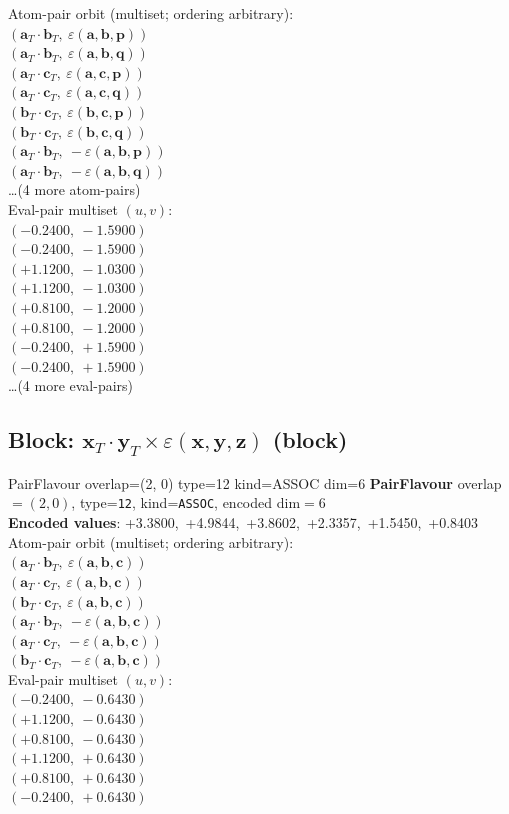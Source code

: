 \documentclass[a4paper,11pt]{article}
\newcommand{\fpbeomcfokjooi}[2]{\mathbf{#1}_T \cdot \mathbf{#2}_T}
\newcommand{\kblbmcpggoncpf}[3]{\varepsilon(\mathbf{#1},\mathbf{#2},\mathbf{#3})}
\begin{document}
\quad Atom-pair orbit (multiset; ordering arbitrary):\\
$(\fpbeomcfokjooi{a}{b},\ \kblbmcpggoncpf{a}{b}{p})$\\
$(\fpbeomcfokjooi{a}{b},\ \kblbmcpggoncpf{a}{b}{q})$\\
$(\fpbeomcfokjooi{a}{c},\ \kblbmcpggoncpf{a}{c}{p})$\\
$(\fpbeomcfokjooi{a}{c},\ \kblbmcpggoncpf{a}{c}{q})$\\
$(\fpbeomcfokjooi{b}{c},\ \kblbmcpggoncpf{b}{c}{p})$\\
$(\fpbeomcfokjooi{b}{c},\ \kblbmcpggoncpf{b}{c}{q})$\\
$(\fpbeomcfokjooi{a}{b},\ -\kblbmcpggoncpf{a}{b}{p})$\\
$(\fpbeomcfokjooi{a}{b},\ -\kblbmcpggoncpf{a}{b}{q})$\\
\quad \ldots (4 more atom-pairs)\\
\quad Eval-pair multiset $(u, v)$:\\
$(-0.2400,\ -1.5900)$\\
$(-0.2400,\ -1.5900)$\\
$(+1.1200,\ -1.0300)$\\
$(+1.1200,\ -1.0300)$\\
$(+0.8100,\ -1.2000)$\\
$(+0.8100,\ -1.2000)$\\
$(-0.2400,\ +1.5900)$\\
$(-0.2400,\ +1.5900)$\\
\quad \ldots (4 more eval-pairs)\\

\subsection{Block: $\fpbeomcfokjooi{x}{y} \times \kblbmcpggoncpf{x}{y}{z}$  (block)}
    PairFlavour  overlap=(2, 0)  type=12  kind=ASSOC  dim=6
\textbf{PairFlavour} overlap$=(2, 0)$, type=\texttt{12}, kind=\texttt{ASSOC}, encoded dim$=6$\\
\textbf{      Encoded values}: +3.3800,\ +4.9844,\ +3.8602,\ +2.3357,\ +1.5450,\ +0.8403\\
\quad Atom-pair orbit (multiset; ordering arbitrary):\\
$(\fpbeomcfokjooi{a}{b},\ \kblbmcpggoncpf{a}{b}{c})$\\
$(\fpbeomcfokjooi{a}{c},\ \kblbmcpggoncpf{a}{b}{c})$\\
$(\fpbeomcfokjooi{b}{c},\ \kblbmcpggoncpf{a}{b}{c})$\\
$(\fpbeomcfokjooi{a}{b},\ -\kblbmcpggoncpf{a}{b}{c})$\\
$(\fpbeomcfokjooi{a}{c},\ -\kblbmcpggoncpf{a}{b}{c})$\\
$(\fpbeomcfokjooi{b}{c},\ -\kblbmcpggoncpf{a}{b}{c})$\\
\quad Eval-pair multiset $(u, v)$:\\
$(-0.2400,\ -0.6430)$\\
$(+1.1200,\ -0.6430)$\\
$(+0.8100,\ -0.6430)$\\
$(+1.1200,\ +0.6430)$\\
$(+0.8100,\ +0.6430)$\\
$(-0.2400,\ +0.6430)$\\
\end{document}
